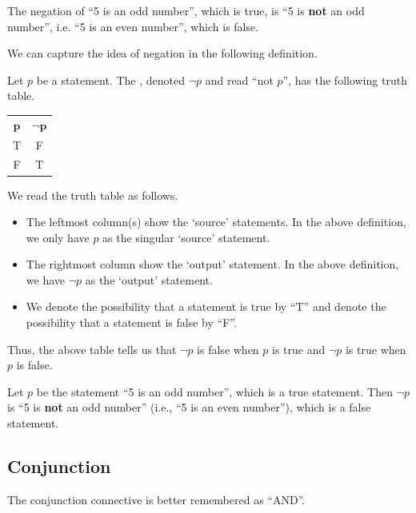 \begin{example}
    The negation of ``5 is an odd number'', which is true, is ``5 is \textbf{not} an odd number'', i.e. ``5 is an even number'', which is false.
\end{example}

We can capture the idea of negation in the following definition.

\begin{definition}[Negation]
    Let $p$ be a statement. The , denoted $\lnot p$ and read ``not $p$'', has the following truth table.
    \begin{table}[H]
        \centering
        \begin{tabular}{|c||c|}
            \hline
            $\boldsymbol{p}$ & $\boldsymbol{\lnot p}$ \\ \hhline{|=#=|}
            T & F \\ \hline
            F & T \\ \hline
        \end{tabular}
    \end{table}
\end{definition}

We read the truth table as follows.
\begin{itemize}
    \item The leftmost column(s) show the `source' statements. In the above definition, we only have $p$ as the singular `source' statement.
    \item The rightmost column show the `output' statement. In the above definition, we have $\lnot p$ as the `output' statement.
    \item We denote the possibility that a statement is true by ``T'' and denote the possibility that a statement is false by ``F''.
\end{itemize}

Thus, the above table tells us that $\lnot p$ is false when $p$ is true and $\lnot p$ is true when $p$ is false.

\begin{example}
    Let $p$ be the statement ``5 is an odd number'', which is a true statement. Then $\lnot p$ is ``5 is \textbf{not} an odd number'' (i.e., ``5 is an even number''), which is a false statement.
\end{example}

\subsection{Conjunction}
The conjunction connective is better remembered as ``AND''.

